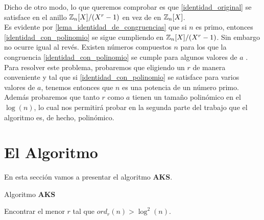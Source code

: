 Dicho de otro modo, lo que queremos comprobar es que \eqref{identidad_original} se satisface en el anillo $\mathbb{Z}_n[X]/(X^r-1)$ en vez de en $\mathbb{Z}_n[X]$.\\

Es evidente por \autoref{lema_identidad_de_congruencias} que si $n$ es primo, entonces \eqref{identidad_con_polinomio} se sigue cumpliendo en $\mathbb{Z}_n[X]/(X^r-1)$. Sin embargo no ocurre igual al revés. Existen números compuestos $n$ para los que la congruencia \eqref{identidad_con_polinomio} se cumple para algunos valores de $a$ \cite{primes_is_in_p}.\\

Para resolver este problema, probaremos que eligiendo un $r$ de manera conveniente y tal que si \eqref{identidad_con_polinomio} se satisface para varios valores de $a$, tenemos entonces que $n$ es una potencia de un número primo.\\

Además probaremos que tanto $r$ como $a$ tienen un tamaño polinómico en el $\log(n)$, lo cual nos permitirá probar en la segunda parte del trabajo que el algoritmo es, de hecho, polinómico.

\section{El Algoritmo}

En esta sección vamos a presentar el algoritmo \textbf{AKS}.

\begin{algorithm}[H]
	\caption{Algoritmo \textbf{AKS}}\label{aks_algorithm}
	\begin{algorithmic}[1]
				\State {}
			\EndIf
			\State
			\State Encontrar el menor $r$ tal que $ord_r(n) > \log^2(n)$.
			\State
				\State {}
			\EndIf
			\State
				\State {}
			\EndIf
			\State
					\State {}
				\EndIf
			\EndFor
			\State
			\State {}
		\EndProcedure
	\end{algorithmic}
\end{algorithm}

